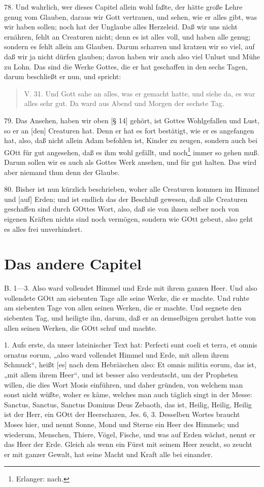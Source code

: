 78. Und wahrlich, wer dieses Capitel allein wohl faßte, der hätte große Lehre genug vom Glauben, daraus wir Gott vertrauen, und sehen, wie er alles gibt, was wir haben sollen; noch hat der Unglaube alles Herzeleid. Daß wir uns nicht ernähren, fehlt an Creaturen nicht; denn es ist alles voll, und haben alle genug; sondern es fehlt allein am Glauben. Darum scharren und kratzen wir so viel, auf daß wir ja nicht dürfen glauben; davon haben wir auch also viel Unlust und Mühe zu Lohn. Das sind die Werke Gottes, die er hat geschaffen in den sechs Tagen, darum beschließt er nun, und spricht:

\begin{quote}
V. 31. Und Gott sahe an alles, was er gemacht hatte, und siehe da, es war alles sehr gut. Da ward aus Abend und Morgen der sechste Tag.
\end{quote}

79. Das Ansehen, haben wir oben [§ 14] gehört, ist Gottes Wohlgefallen und Lust, so er an [den] Creaturen hat. Denn er hat es fort bestätigt, wie er es angefangen hat, also, daß nicht allein Adam befohlen ist, Kinder zu zeugen, sondern auch bei GOtt für gut angesehen, daß es ihm wohl gefällt, und noch\footnote{Erlanger: nach.} immer so gehen muß. Darum sollen wir es auch als Gottes Werk ansehen, und für gut halten. Das wird aber niemand thun denn der Glaube.

80. Bisher ist nun kürzlich beschrieben, woher alle Creaturen kommen im Himmel und [auf] Erden; und ist endlich das der Beschluß gewesen, daß alle Creaturen geschaffen sind durch GOttes Wort, also, daß sie von ihnen selber noch von eigenen Kräften nichts sind noch vermögen, sondern wie GOtt gebeut, also geht es alles frei unverhindert.

\section{Das andere Capitel}

B. 1—3. Also ward vollendet Himmel und Erde mit ihrem ganzen Heer. Und also vollendete GOtt am siebenten Tage alle seine Werke, die er machte. Und ruhte am siebenten Tage von allen seinen Werken, die er machte. Und segnete den siebenten Tag, und heiligte ihn, darum, daß er an demselbigen geruhet hatte von allen seinen Werken, die GOtt schuf und machte.

1. Aufs erste, da unser lateinischer Text hat: Perfecti sunt coeli et terra, et omnis ornatus eorum, „also ward vollendet Himmel und Erde, mit allem ihrem Schmuck“, heißt [es] nach dem Hebräischen also: Et omnis militia eorum, das ist, „mit allem ihrem Heer“, und ist besser also verdeutscht, um der Propheten willen, die dies Wort Mosis einführen, und daher gründen, von welchem man sonst nicht wüßte, woher es käme, welches man auch täglich singt in der Messe: Sanctus, Sanctus, Sanctus Dominus Deus Zebaoth, das ist, Heilig, Heilig, Heilig ist der Herr, ein GOtt der Heerscharen, Jes. 6, 3. Desselben Wortes braucht Moses hier, und nennt Sonne, Mond und Sterne ein Heer des Himmels; und wiederum, Menschen, Thiere, Vögel, Fische, und was auf Erden wächst, nennt er das Heer der Erde. Gleich als wenn ein Fürst mit seinem Heer zeucht, so zeucht er mit ganzer Gewalt, hat seine Macht und Kraft alle bei einander.

